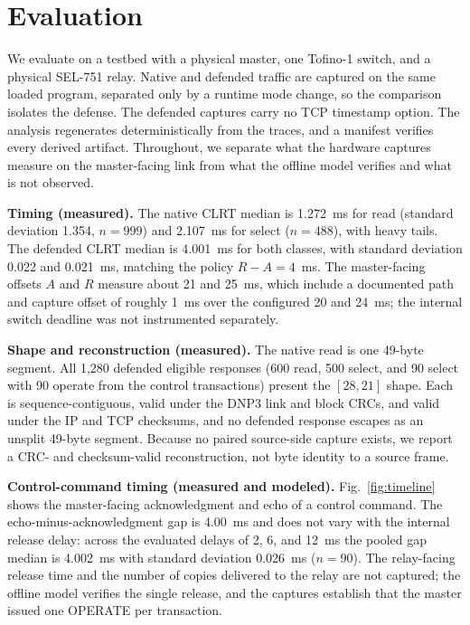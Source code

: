 \section{Evaluation}
\label{sec:eval}

We evaluate on a testbed with a physical master, one Tofino-1 switch, and a physical SEL-751 relay.
Native and defended traffic are captured on the same loaded program, separated only by a runtime mode
change, so the comparison isolates the defense. The defended captures carry no TCP timestamp option.
The analysis regenerates deterministically from the traces, and a manifest verifies every derived
artifact. Throughout, we separate what the hardware captures measure on the master-facing link from
what the offline model verifies and what is not observed.

\noindent\textbf{Timing (measured).} The native CLRT median is 1.272~ms for read (standard deviation
1.354, $n{=}999$) and 2.107~ms for select ($n{=}488$), with heavy tails. The defended CLRT median is
4.001~ms for both classes, with standard deviation 0.022 and 0.021~ms, matching the policy $R-A=4$~ms.
The master-facing offsets $A$ and $R$ measure about 21 and 25~ms, which include a documented path and
capture offset of roughly 1~ms over the configured 20 and 24~ms; the internal switch deadline was not
instrumented separately.

\noindent\textbf{Shape and reconstruction (measured).} The native read is one 49-byte segment. All
1{,}280 defended eligible responses (600 read, 500 select, and 90 select with 90 operate from the
control transactions) present the $[28,21]$ shape. Each is sequence-contiguous, valid under the DNP3
link and block CRCs, and valid under the IP and TCP checksums, and no defended response escapes as an
unsplit 49-byte segment. Because no paired source-side capture exists, we report a CRC- and
checksum-valid reconstruction, not byte identity to a source frame.

\noindent\textbf{Control-command timing (measured and modeled).} Fig.~\ref{fig:timeline} shows the
master-facing acknowledgment and echo of a control command. The echo-minus-acknowledgment gap is
4.00~ms and does not vary with the internal release delay: across the evaluated delays of 2, 6, and
12~ms the pooled gap median is 4.002~ms with standard deviation 0.026~ms ($n{=}90$). The relay-facing
release time and the number of copies delivered to the relay are not captured; the offline model
verifies the single release, and the captures establish that the master issued one OPERATE per
transaction.

